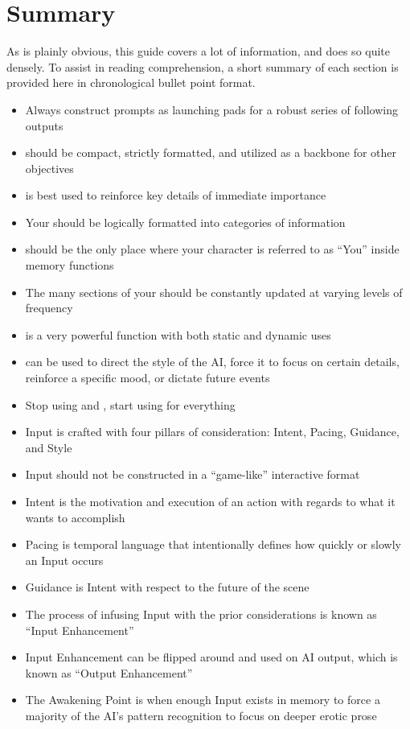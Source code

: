 \documentclass[Coomer-main.tex]{subfiles}
\begin{document}
\chapter{Summary}
\label{ch:summary}

As is plainly obvious, this guide covers a lot of information, and does so quite densely.
To assist in reading comprehension, a short summary of each section is provided here in chronological bullet point format.

\begin{itemize}

\item{Always construct prompts as launching pads for a robust series of following outputs}

\item{\wi should be compact, strictly formatted, and utilized as a backbone for other objectives}

\item{\rem is best used to reinforce key details of immediate importance}
\item{Your \rem should be logically formatted into categories of information}
\item{\rem should be the only place where your character is referred to as “You” inside memory functions}
\item{The many sections of your \rem should be constantly updated at varying levels of frequency}

\item{\an is a very powerful function with both static and dynamic uses} 
\item{\an can be used to direct the style of the AI, force it to focus on certain details, reinforce a specific mood, or dictate future events}

\item{Stop using \Do and \say, start using \story for everything}
\item{Input is crafted with four pillars of consideration: Intent, Pacing, Guidance, and Style}
\item{Input should not be constructed in a “game-like” interactive format}
\item{Intent is the motivation and execution of an action with regards to what it wants to accomplish}
\item{Pacing is temporal language that intentionally defines how quickly or slowly an Input occurs}
\item{Guidance is Intent with respect to the future of the scene}
\item{The process of infusing Input with the prior considerations is known as “Input Enhancement”}
\item{Input Enhancement can be flipped around and used on AI output, which is known as “Output Enhancement”}
\item{The Awakening Point is when enough Input exists in memory to force a majority of the AI's pattern recognition to focus on deeper erotic prose}


\end{itemize}
\end{document}
